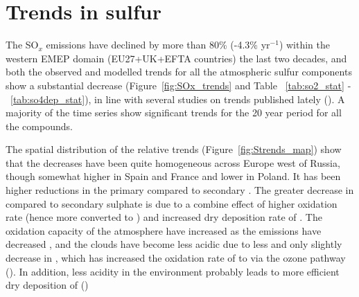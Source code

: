 \section{\label{sec:Trends_sulfur}Trends in sulfur}

The SO$_x$ emissions have declined by more than 80\% (-4.3\% yr$^{-1}$) within the western EMEP domain (EU27+UK+EFTA countries) the last two decades, and both the observed and modelled trends for all the atmospheric sulfur components show a substantial decrease (Figure~\ref{fig:SOx_trends} and Table ~\ref{tab:so2_stat} - ~\ref{tab:so4dep_stat}), in line with several studies on trends published lately (\cite{aas2019global,TFMM2016, Vivanco2018, Theobald2019, Colette2021, Banzhaf2015, torseth2012, Crippa2016}). A majority of the time series show significant trends for the 20 year period for all the compounds.

The spatial distribution of the relative trends (Figure~\ref{fig:Strends_map}) show that the decreases have been quite homogeneous across Europe west of Russia, though somewhat higher in Spain and France and lower in Poland. It has been higher reductions in the primary \soii compared to  secondary \soiv. The greater decrease in \soii compared to secondary sulphate is due to a combine effect of higher oxidation rate (hence more \soii converted to \soiv) and increased dry deposition rate of \soii. The oxidation capacity of the atmosphere have increased as the emissions have decreased \cite{Dalsoren2016}, and the clouds have become less acidic due to less \soii and only slightly decrease in \nhiii, which has increased the oxidation rate of \soii to \soiv via the ozone pathway (\cite{Banzhaf2015, Redington2009}). In addition, less acidity in the environment probably leads to more efficient dry deposition of \soii (\cite{Fowler_et_al:2009}) 

